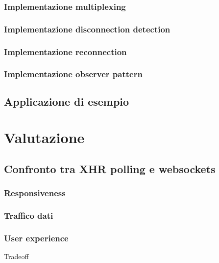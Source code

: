 \documentclass[12pt,a4paper,openright]{report}
\begin{document}
\subsection{Implementazione multiplexing}

\subsection{Implementazione disconnection detection}

\subsection{Implementazione reconnection}

\subsection{Implementazione observer pattern}

\section{Applicazione di esempio}\label{sec_applicazioneesempio}

\chapter{Valutazione}

\section{Confronto tra XHR polling e websockets}\label{sec_confrontopollingwebsockets}

\subsection{Responsiveness}

\subsection{Traffico dati}

\subsection{User experience}
Tradeoff
\end{document}
